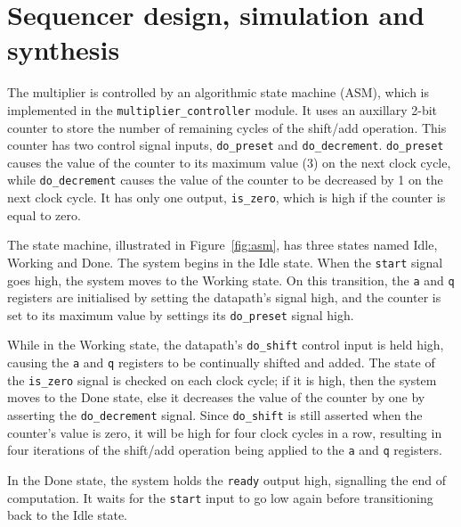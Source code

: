 \documentclass[a4paper]{article}
\begin{document}

\section{Sequencer design, simulation and synthesis}
\label{sec:seq}

The multiplier is controlled by an algorithmic state machine (ASM), which is implemented in the \texttt{multiplier\_controller} module. It uses an auxillary 2-bit counter to store the number of remaining cycles of the shift/add operation. This counter has two control signal inputs, \texttt{do\_preset} and \texttt{do\_decrement}. \texttt{do\_preset} causes the value of the counter to its maximum value (3) on the next clock cycle, while \texttt{do\_decrement} causes the value of the counter to be decreased by 1 on the next clock cycle. It has only one output, \texttt{is\_zero}, which is high if the counter is equal to zero.

The state machine, illustrated in Figure~\ref{fig:asm}, has three states named Idle, Working and Done. The system begins in the Idle state. When the \texttt{start} signal goes high, the system moves to the Working state. On this transition, the \texttt{a} and \texttt{q} registers are initialised by setting the datapath's  signal high, and the counter is set to its maximum value by settings its \texttt{do\_preset} signal high.

While in the Working state, the datapath's \texttt{do\_shift} control input is held high, causing the \texttt{a} and \texttt{q} registers to be continually shifted and added. The state of the \texttt{is\_zero} signal is checked on each clock cycle; if it is high, then the system moves to the Done state, else it decreases the value of the counter by one by asserting the \texttt{do\_decrement} signal. Since \texttt{do\_shift} is still asserted when the counter's value is zero, it will be high for four clock cycles in a row, resulting in four iterations of the shift/add operation being applied to the \texttt{a} and \texttt{q} registers.

In the Done state, the system holds the \texttt{ready} output high, signalling the end of computation. It waits for the \texttt{start} input to go low again before transitioning back to the Idle state.
\end{document}
